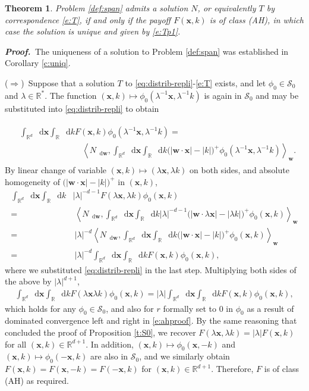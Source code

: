\documentclass[11pt,A4,twoside]{article}
\numberwithin{equation}{section}
\renewcommand*\d{\mathop{}\!\mathrm{d}}
\newcommand{\norm}[1]{\left|#1 \right|}
\newcommand{\inner}[1]{\left\langle#1 \right\rangle}
\newcommand{\x}{\mathbf{x}}
\newcommand{\w}{\mathbf{w}}
\newcommand{\R}{\mathbbm{R}}
\renewcommand{\S}{\mathcal{S}}
\newcommand{\intRd}{\int_{\R^d}}
\newcommand{\intR}{\int_{\R}}
\def\qqq{\;\;\;\;\;\;\;\;\;}
\newcommand{\beqa}{\begin{eqnarray}}
\newcommand{\eeqa}{\end{eqnarray}}
\def\bal{\begin{aligned}}
\def\eal{\end{aligned}}
\def\bll#1{
\beqa\label{#1}\bal
}\def\lel{\eal\eeqa}
\newcommand{\beql}[1]{\bll{#1}}
\newcommand{\eeql}{\lel}
\newtheorem{theorem}{Theorem}[section]
\theoremstyle{definition}
\theoremstyle{remark}
\def\AHl{{\rm AHa}\xspace}\def\AHl{{\rm (AH)}\xspace}
\def\R{\mathbb{R}}
\def\proof{\noindent \emph{\textbf{Proof.} $\, $}}
\begin{document}
\begin{theorem}     \label{t:abs-homogeneous}
Problem \ref{def:span} admits a solution $N$, or equivalently $T$ by correspondence \eqref{e:T}, if and only if the payoff $ F(\x, k)$ is of class \AHl, in which case the solution is unique and given by 
\eqref{e:Tp1}. 
\end{theorem}

\proof The uniqueness of a solution to Problem \ref{def:span} was established in Corollary \ref{c:uniq}.  

\noindent($\Rightarrow$)~Suppose that a solution $T$ to \eqref{eq:distrib-repli}-\eqref{e:T} exists, and let $\phi_0 \in \S_0$ and $\lambda\in\R^*$. The function $(\x,k) \mapsto \phi_0(\lambda^{-1}\x,\lambda^{-1}k)$ is again in $\S_0$ and may be substituted into \eqref{eq:distrib-repli} to obtain
\beql{e:pahl0}
         &\intRd \d \x \intR \d k  F(\x,  k) \phi_0(\lambda^{-1}\x, \lambda^{-1}k) =
     \\
        &\qqq\qqq\qqq  \inner{N_{\d \w}, \intRd \d \x \intR \d k \big(|\w \cdot \x | - |k |\big)^+ \phi_0 (\lambda^{-1}\x, \lambda^{-1}k) }_{\w}. 
\eeql
By linear change of variable $(\x, k) \mapsto (\lambda \x, \lambda k)$ on both sides, and absolute homogeneity of $ \big(|\w\cdot\x| -| k| \big)^+ $ in $(\x, k)$,
\begin{align*}
    \intRd \d \x \intR \d k & |\lambda|^{-d-1} F( \lambda \x, \lambda k) \phi_0 ( \x, k)
    \\ =&\ 
      \inner{N_{\d \w}, \intRd \d \x \intR \d k |\lambda|^{-d-1} \big(|\w\cdot \lambda \x| -| \lambda k| \big)^+ \phi_0 (\x, k) }_{\w}
     \\ =&\ 
     |\lambda|^{-d} \inner{N_{\d \w}, \intRd \d \x \intR \d k \big(|\w\cdot  \x| - | k| \big)^+ \phi_0 (\x, k) }_{\w}
     \\ =&\ 
     |\lambda|^{-d}\intRd \d \x \intR \d k  F(\x,  k) \phi_0 ( \x, k),
\end{align*}
where we substituted \eqref{eq:distrib-repli} in the last step.  Multiplying both sides of the above by $\norm\lambda^{d+1}$,
    \begin{align}\label{e:ahproof}
        \intRd \d \x \intR \d k 
        F( \lambda \x \lambda k) \phi_0 ( \x, k) = |\lambda|\intRd \d \x \intR \d k  F(\x,  k) \phi_0 ( \x, k),
    \end{align}
    which holds for any $\phi_0\in\S_0$, and also for $r$ formally set to 0 in $\phi_0$ as a result of dominated convergence left and right in \eqref{e:ahproof}. By the same reasoning that concluded the proof of Proposition \ref{t:S0}, we recover $ F( \lambda \x, \lambda k)  = |\lambda|F(\x,  k)$ for all $(\x , k)\in\R^{d+1}$. In addition, $(\x,k) \mapsto \phi_0(\x,-k)$ and $(\x,k) \mapsto \phi_0(-\x,k)$ are also in $\S_0$, and we similarly obtain $F(\x,k) =F(\x,-k) =F(-\x,k)$ for $(\x , k)\in\R^{d+1}$. Therefore, $F$ is of class \AHl as required.
\vspace{1.5mm}
\end{document}
